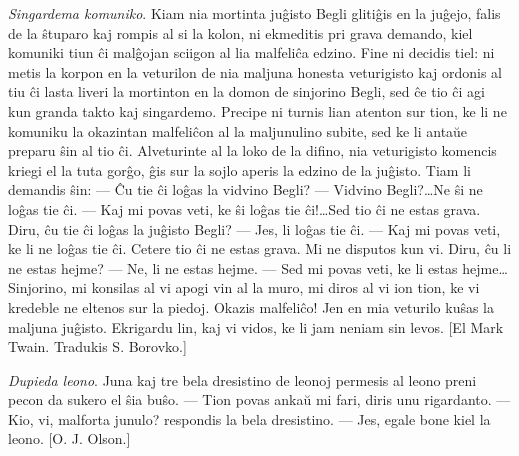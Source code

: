 \emph{Singardema komuniko}. Kiam nia mortinta ju\^gisto Begli
gliti\^gis en la ju\^gejo, falis de la \^stuparo kaj rompis al si la
kolon, ni ekmeditis pri grava demando, kiel komuniki tiun \^ci
mal\^gojan sciigon al lia malfeli\^ca edzino. Fine ni decidis tiel:
ni metis la korpon en la veturilon de nia maljuna honesta
veturigisto kaj ordonis al tiu \^ci lasta liveri la mortinton en la
domon de sinjorino Begli, sed \^ce tio \^ci agi kun granda takto kaj
singardemo. Precipe ni turnis lian atenton sur tion, ke li ne
komuniku la okazintan malfeli\^con al la maljunulino subite, sed ke
li anta\u ue preparu \^sin al tio \^ci. Alveturinte al la loko de la
difino, nia veturigisto komencis kriegi el la tuta gor\^go, \^gis
sur la sojlo aperis la edzino de la ju\^gisto. Tiam li demandis
\^sin: --- \^Cu tie \^ci lo\^gas la vidvino Begli? --- Vidvino
Begli?\dots Ne \^si ne lo\^gas tie \^ci. --- Kaj mi povas veti, ke
\^si lo\^gas tie \^ci!\dots Sed tio \^ci ne estas grava. Diru, \^cu
tie \^ci lo\^gas la ju\^gisto Begli? --- Jes, li lo\^gas tie \^ci.
--- Kaj mi povas veti, ke li ne lo\^gas tie \^ci. Cetere tio \^ci ne
estas grava. Mi ne disputos kun vi. Diru, \^cu li ne estas hejme?
--- Ne, li ne estas hejme. --- Sed mi povas veti, ke li estas
hejme\dots Sinjorino, mi konsilas al vi apogi vin al la muro, mi
diros al vi ion tion, ke vi kredeble ne eltenos sur la piedoj.
Okazis malfeli\^co! Jen en mia veturilo ku\^sas la maljuna
ju\^gisto. Ekrigardu lin, kaj vi vidos, ke li jam neniam sin levos.
[El Mark Twain. Tradukis S. Borovko.]

\emph{Dupieda leono}. Juna kaj tre bela dresistino de leonoj
permesis al leono preni pecon da sukero el \^sia bu\^so. --- Tion
povas anka\u u mi fari, diris unu rigardanto. --- Kio, vi, malforta
junulo? respondis la bela dresistino. --- Jes, egale bone kiel la
leono. [O. J. Olson.]
